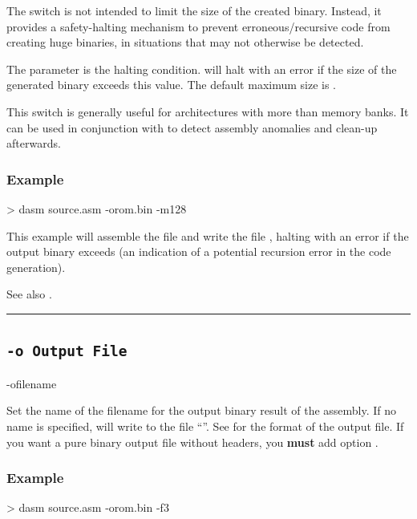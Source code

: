 \label{changelog:20200908optionm}

The  switch is not intended to limit the size of the created binary. Instead, it provides a safety-halting mechanism to prevent erroneous/recursive code from creating huge binaries, in situations that may not otherwise be detected.

The  parameter is the halting condition. \dasm will halt with an error if the size of the generated binary exceeds this value. The default maximum size is .

This switch is generally useful for architectures with more than  memory banks. It can be used in conjunction with  to detect assembly anomalies and clean-up afterwards.

\subsubsection{Example}
\begin{outputx}
> dasm source.asm -orom.bin -m128
\end{outputx}

This example will assemble the file  and write the file , halting with an error if the output binary exceeds  (an indication of a potential recursion error in the code generation).

See also .\\

\hrule


\subsection{\texttt{-o Output File}}
\label{flag:outputfile}

\begin{usage}
-ofilename
\end{usage}

Set the name of the filename for the output binary result of the assembly. If no name is specified, \dasm will write to the file ``''. See  for the format of the output file. If you want a pure binary output file without headers, you \textbf{must} add option .

\subsubsection{Example}
\begin{outputx}
> dasm source.asm -orom.bin -f3
\end{outputx}

